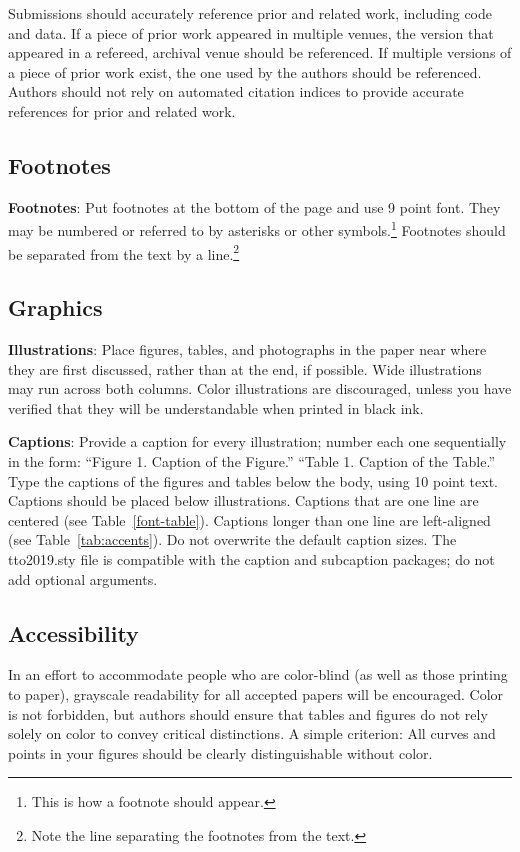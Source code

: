 \documentclass[11pt,a4paper]{article}
\begin{document}
Submissions should accurately reference prior and related work, including code and data. If a piece of prior work appeared in multiple venues, the version that appeared in a refereed, archival venue should be referenced. If multiple versions of a piece of prior work exist, the one used by the authors should be referenced. Authors should not rely on automated citation indices to provide accurate references for prior and related work.

\subsection{Footnotes}

\textbf{Footnotes}: Put footnotes at the bottom of the page and use 9
point font. They may be numbered or referred to by asterisks or other
symbols.\footnote{This is how a footnote should appear.} Footnotes
should be separated from the text by a line.\footnote{Note the line
separating the footnotes from the text.}

\subsection{Graphics}

\textbf{Illustrations}: Place figures, tables, and photographs in the
paper near where they are first discussed, rather than at the end, if
possible.  Wide illustrations may run across both columns.  Color
illustrations are discouraged, unless you have verified that  
they will be understandable when printed in black ink.

\textbf{Captions}: Provide a caption for every illustration; number each one
sequentially in the form:  ``Figure 1. Caption of the Figure.'' ``Table 1.
Caption of the Table.''  Type the captions of the figures and 
tables below the body, using 10 point text. Captions should be placed below illustrations. Captions that are one line are centered (see Table~\ref{font-table}). Captions longer than one line are left-aligned (see Table~\ref{tab:accents}). Do not overwrite the default caption sizes. The tto2019.sty file is compatible with the caption and subcaption packages; do not add optional arguments.


\subsection{Accessibility}
\label{ssec:accessibility}

In an effort to accommodate people who are color-blind (as well as those printing
to paper), grayscale readability for all accepted papers will be
encouraged.  Color is not forbidden, but authors should ensure that
tables and figures do not rely solely on color to convey critical
distinctions. A simple criterion: All curves and points in your figures should be clearly distinguishable without color.
\end{document}
